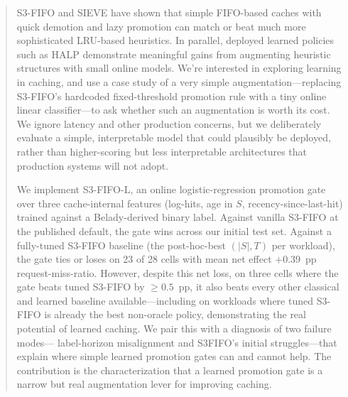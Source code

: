 \documentclass[letterpaper,twocolumn,10pt]{article}
\begin{document}
\begin{abstract}
S3-FIFO and SIEVE have shown that simple FIFO-based caches with quick
demotion and lazy promotion can match or beat much more sophisticated
LRU-based heuristics. In parallel, deployed learned policies such as
HALP demonstrate meaningful gains from augmenting heuristic structures
with small online models. We're interested in exploring learning in
caching, and use a case study of a very simple augmentation---replacing
S3-FIFO's hardcoded fixed-threshold promotion rule with a tiny online
linear classifier---to ask whether such an augmentation is worth its
cost. We ignore latency and other production concerns, but we
deliberately evaluate a simple, interpretable model that could
plausibly be deployed, rather than higher-scoring but less
interpretable architectures that production systems will not adopt.

We implement S3-FIFO-L, an online logistic-regression promotion gate
over three cache-internal features (log-hits, age in $S$,
recency-since-last-hit) trained against a Belady-derived binary
label. Against vanilla S3-FIFO at the published default, the gate
wins across our initial test set. Against a fully-tuned S3-FIFO
baseline (the post-hoc-best $(|S|, T)$ per workload), the gate ties
or loses on 23 of 28 cells with mean net effect $+0.39$~pp
request-miss-ratio. However, despite this net loss, on three cells where the gate beats tuned S3-FIFO
by $\geq 0.5$~pp, it also beats every other classical and learned
baseline available---including on workloads where tuned S3-FIFO is
already the best non-oracle policy, demonstrating the real potential of learned caching. We pair this with a
diagnosis of two failure modes---
label-horizon misalignment and S3FIFO's initial struggles---that explain where simple learned promotion gates can and
cannot help. The contribution is the characterization that a learned
promotion gate is a narrow but real augmentation lever for improving caching. 
\end{abstract}
\end{document}
